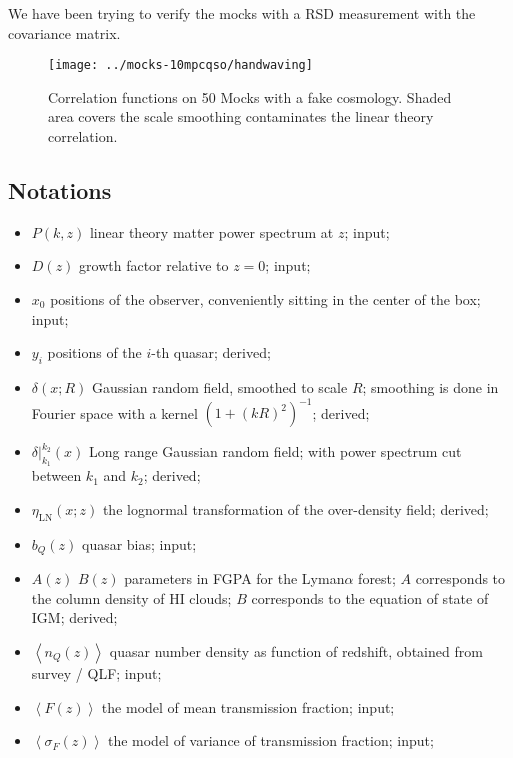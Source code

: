 \documentclass{paper}
\begin{document}
    We have been trying to verify the mocks with a RSD
    measurement with the covariance matrix. 
    \begin{figure}
        \texttt{[image: ../mocks-10mpcqso/handwaving]}
        \caption{Correlation functions on 50 Mocks with a
        fake cosmology. Shaded area covers the scale
        smoothing contaminates the linear theory correlation.  }
        \label{fig:handwave}
    \end{figure}

\subsection{Notations}
\begin{itemize}
    \item $P(k, z)$
        linear theory matter power spectrum at $z$; input;
    \item $D(z)$
        growth factor relative to $z=0$; input;

    \item $x_0$ positions of the observer, conveniently
        sitting in the center of the box; input;

    \item $y_i$ positions of the $i$-th quasar; derived;

    \item $\delta(x; R)$ 
        Gaussian random field, smoothed to scale $R$;
        smoothing is done in Fourier space with a kernel 
        $(1 + (kR)^2)^{-1}$; derived;
    \item $\delta|_{k_1}^{k_2}(x)$ 
        Long range Gaussian random field; with power
        spectrum cut between $k_1$ and $k_2$; derived;

    \item $\eta_\mathrm{LN}(x; z)$ the lognormal
        transformation of the over-density field; derived;

    \item $b_Q(z)$ quasar bias; input;

    \item $A(z)$ $B(z)$ parameters in FGPA for 
        the Lyman$\alpha$ forest; $A$ corresponds to the
        column density of HI clouds; $B$ corresponds to the 
        equation of state of IGM; derived;

    \item $\left<n_Q(z)\right>$ quasar number density as
        function of redshift, obtained from survey / QLF;
        input;
    \item $\left<F(z)\right>$ the model of mean transmission
        fraction; input;
    \item $\left<\sigma_F(z)\right>$ the model of variance of
        transmission fraction; input;

\end{itemize}
\end{document}
